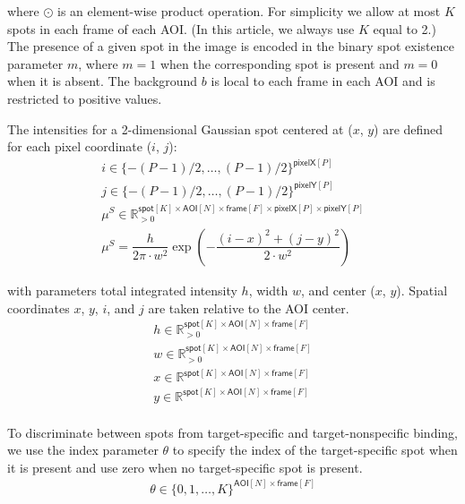 \noindent
where $\odot$ is an element-wise product operation. For simplicity we allow at most $K$ spots in each frame of each AOI.  (In this article, we always use $K$ equal to 2.)  The presence of a given spot in the image is encoded in the binary spot existence parameter $m$, where $m = 1$ when the corresponding spot is present and $m = 0$ when it is absent. The background $b$ is local to each frame in each AOI and is restricted to positive values.



The intensities for a 2-dimensional Gaussian spot centered at ($x$, $y$) are defined for each pixel coordinate ($i$, $j$):
%
\begin{gather*}
    i \in \{-(P-1)/2, \dots, (P-1)/2\}^{\mathsf{pixelX}[P]} \\
    j \in \{-(P-1)/2, \dots, (P-1)/2\}^{\mathsf{pixelY}[P]} \\
    \mu^S \in \mathbb{R}_{>0}^{\mathsf{spot}[K] \times \mathsf{AOI}[N] \times \mathsf{frame}[F] \times \mathsf{pixelX}[P] \times \mathsf{pixelY}[P]}  \\
    \mu^S = \dfrac{h}{2 \pi \cdot w^2} \exp{\left( -\dfrac{(i-x)^2 + (j-y)^2}{2 \cdot w^2} \right)}
\end{gather*}

\noindent
with parameters total integrated intensity $h$, width $w$, and center ($x$, $y$). Spatial coordinates $x$, $y$, $i$, and $j$ are taken relative to the AOI center. 
%
\begin{gather*}
    h \in \mathbb{R}_{>0}^{\mathsf{spot}[K] \times \mathsf{AOI}[N] \times \mathsf{frame}[F]} \\
    w \in \mathbb{R}_{>0}^{\mathsf{spot}[K] \times \mathsf{AOI}[N] \times \mathsf{frame}[F]} \\
    x \in \mathbb{R}^{\mathsf{spot}[K] \times \mathsf{AOI}[N] \times \mathsf{frame}[F]} \\
    y \in \mathbb{R}^{\mathsf{spot}[K] \times \mathsf{AOI}[N] \times \mathsf{frame}[F]} \\
\end{gather*}



To discriminate between spots from target-specific and target-nonspecific binding, we use the index parameter $\theta$ to specify the index of the target-specific spot when it is present and use zero when no target-specific spot is present.
%
\begin{gather*}
    \theta \in \{ 0, 1, \dots, K \}^{ \mathsf{AOI}[N] \times \mathsf{frame}[F] } \\
\end{gather*}

